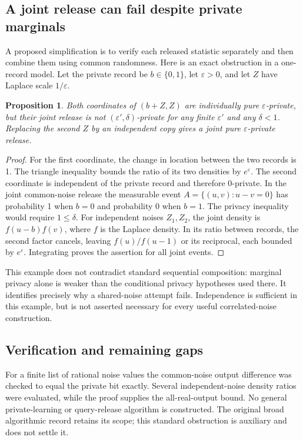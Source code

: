 \documentclass[11pt]{article}
\newtheorem{proposition}{Proposition}
\begin{document}
\subsection{A joint release can fail despite private marginals}
A proposed simplification is to verify each released statistic separately and then combine them using common randomness. Here is an exact obstruction in a one-record model. Let the private record be $b\in\{0,1\}$, let $\varepsilon>0$, and let $Z$ have Laplace scale $1/\varepsilon$.
\begin{proposition}
Both coordinates of $(b+Z,Z)$ are individually pure $\varepsilon$-private, but their joint release is not $(\varepsilon',\delta)$-private for any finite $\varepsilon'$ and any $\delta<1$. Replacing the second $Z$ by an independent copy gives a joint pure $\varepsilon$-private release.
\end{proposition}
\begin{proof}
For the first coordinate, the change in location between the two records is 1. The triangle inequality bounds the ratio of its two densities by $e^\varepsilon$. The second coordinate is independent of the private record and therefore 0-private. In the joint common-noise release the measurable event $A=\{(u,v):u-v=0\}$ has probability 1 when $b=0$ and probability 0 when $b=1$. The privacy inequality would require $1\le\delta$.
For independent noises $Z_1,Z_2$, the joint density is $f(u-b)f(v)$, where $f$ is the Laplace density. In its ratio between records, the second factor cancels, leaving $f(u)/f(u-1)$ or its reciprocal, each bounded by $e^\varepsilon$. Integrating proves the assertion for all joint events.
\end{proof}
This example does not contradict standard sequential composition: marginal privacy alone is weaker than the conditional privacy hypotheses used there. It identifies precisely why a shared-noise attempt fails. Independence is sufficient in this example, but is not asserted necessary for every useful correlated-noise construction.
\subsection{Verification and remaining gaps}
For a finite list of rational noise values the common-noise output difference was checked to equal the private bit exactly. Several independent-noise density ratios were evaluated, while the proof supplies the all-real-output bound. No general private-learning or query-release algorithm is constructed. The original broad algorithmic record retains its scope; this standard obstruction is auxiliary and does not settle it.
\end{document}
